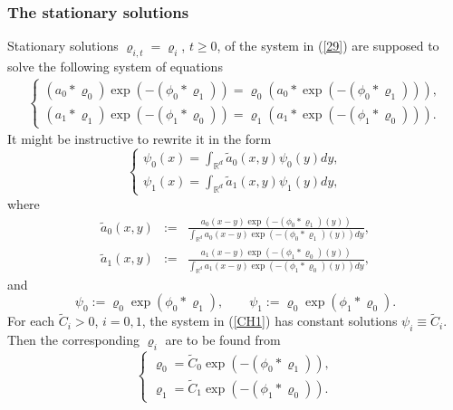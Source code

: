 \documentclass[reqno,11pt]{amsart}
\theoremstyle{definition}
\theoremstyle{remark}
\numberwithin{equation}{section}
\begin{document}
\subsubsection{The stationary solutions}
Stationary solutions $\varrho_{i,t} = \varrho_i$, $t\geq 0$, of the
system in (\ref{29}) are supposed to solve the following system of
equations
\begin{eqnarray}
  \label{Ch}
 \left\{ \begin{array}{ll}
(a_0 \ast \varrho_{0}) \exp\left( - (\phi_0 \ast \varrho_{1})\right)
 =  \varrho_{0} \left( a_0 \ast
\exp\left( - (\phi_0 \ast \varrho_{1})\right) \right), \\[.2cm]
(a_1 \ast \varrho_{1}) \exp\left( - (\phi_1 \ast \varrho_{0})\right)
=  \varrho_{1} \left( a_1 \ast \exp\left( - (\phi_1 \ast
\varrho_{0})\right) \right).  \end{array} \right.
\end{eqnarray}
It might be instructive to rewrite it in the form
\begin{equation}
  \label{CH1}
  \left\{ \begin{array}{ll} \psi_0 (x) = \int_{\mathds{R}^d} \tilde{a}_0
  (x,y) \psi_0 (y) dy, \\[.3cm]
\psi_1 (x) = \int_{\mathds{R}^d} \tilde{a}_1
  (x,y) \psi_1 (y) dy,
  \end{array}\right.
\end{equation}
where
\begin{eqnarray*}
\tilde{a}_0 (x,y) & := & \frac{a_0 (x-y) \exp\left( - (\phi_0 \ast
\varrho_{1})(y)\right)}{\int_{\mathds{R}^d}a_0 (x-y) \exp\left( -
(\phi_0 \ast \varrho_{1})(y)\right)d y}, \\[.2cm]
\tilde{a}_1 (x,y) & := & \frac{a_1 (x-y) \exp\left( - (\phi_1 \ast
\varrho_{0})(y)\right)}{\int_{\mathds{R}^d}a_1 (x-y) \exp\left( -
(\phi_1 \ast \varrho_{0})(y)\right)d y},
\end{eqnarray*}
and
\begin{equation}
  \label{CH}
 \psi_0 := \varrho_0 \exp\left(\phi_0 \ast
\varrho_{1}\right), \qquad  \psi_1 := \varrho_0 \exp\left( \phi_1
\ast \varrho_{0}\right).
\end{equation}
For each $\widetilde{C}_i> 0$, $i=0,1$, the system in (\ref{CH1})
has constant solutions $\psi_i \equiv \widetilde{C}_i$.  Then the
corresponding $\varrho_i$ are to be found from
\begin{equation}
  \label{Ch1}
\left\{\begin{array}{l} \varrho_0 = \widetilde{C}_0 \exp\left( -
(\phi_0 \ast \varrho_{1})\right), \\[.2cm] \varrho_1 = \widetilde{C}_1 \exp\left( -
(\phi_1 \ast \varrho_{0})\right). \end{array} \right.
\end{equation}
\end{document}
